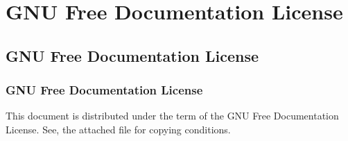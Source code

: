 \section*{GNU Free Documentation License}\label{SEC:FDL}
\subsection*{GNU Free Documentation License}\label{SEC:FDL}
 \subsubsection{GNU Free Documentation License}\label{SEC:FDL}

This document is distributed under the term of the GNU Free Documentation
License. See, the attached file for copying conditions.
